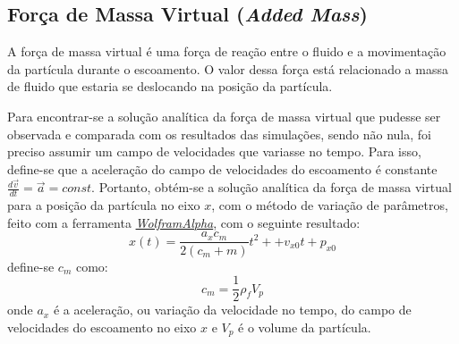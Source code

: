 \subsection{\textbf{Força de Massa Virtual (\textit{Added Mass})}}
\label{sec_mass}
A força de massa virtual é uma força de reação entre o fluido e a movimentação da partícula durante o escoamento.
O valor dessa força está relacionado a massa de fluido que estaria se deslocando na posição da partícula.

Para encontrar-se a solução analítica da força de massa virtual que pudesse ser observada e comparada com os resultados das simulações, sendo não nula, foi preciso assumir um campo de velocidades que variasse no tempo.
Para isso, define-se que a aceleração do campo de velocidades do escoamento é constante $\tfrac{d\vec{v}}{dt}=\vec{a}=const$.
Portanto, obtém-se a solução analítica da força de massa virtual para a posição da partícula no eixo $x$, com o método de variação de parâmetros, feito com a ferramenta \href{https://www.wolframalpha.com}{\textit{WolframAlpha}}, com o seguinte resultado:
\begin{equation}
    x(t) = \dfrac{a_x c_m}{2(c_m + m)}t^2 + + v_{x0}t + p_{x0}
    \label{mass_sol} 
\end{equation}
define-se $c_m$ como:
\begin{equation}
    c_m = \dfrac{1}{2} \rho_f V_p
    \label{mass_c} 
\end{equation}
onde $a_x$ é a aceleração, ou variação da velocidade no tempo, do campo de velocidades do escoamento no eixo $x$ e $V_p$ é o volume da partícula.


